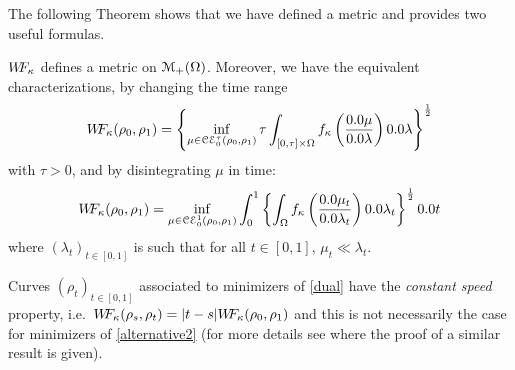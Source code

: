 The following Theorem shows that we have defined a metric and provides two useful formulas. 

\begin{theorem}
$W\! \! F_{\kappa}$ defines a metric on $\mathcal{M}_+(\Omega)$. Moreover, we have the equivalent characterizations, by changing the time range
\begin{equation}
\label{alternative1}
\WF_{\kappa}(\rho_0,\rho_1) = \left\{ \inf_{\mu \in \mathcal{CE}_0^{\tau}(\rho_0,\rho_1)} \tau  \int_{[0,\tau] \times \Om} \fonc\left(\frac{\d\mu}{\d\lambda}\right) \d\lambda \right\}^{\frac12} 
\end{equation}
with $\tau > 0$, and by disintegrating $\mu$ in time:
\begin{equation}
\label{alternative2}
\WF_{\kappa}(\rho_0,\rho_1)= \inf_{\mu \in \mathcal{CE}_0^1(\rho_0,\rho_1)} \int_0^1 \left\{ \int_{\Om} \fonc\left( \frac{\d\mu_t}{\d\lambda_t}\right) \d\lambda_t \right\}^{\frac12} \d t
\end{equation}
where $(\lambda_t)_{t\in [0,1]}$ is such that for all $t \in [0,1]$, $\mu_t \ll \lambda_t$.
\end{theorem}

\begin{remark}
Curves $(\rho_t)_{t\in [0,1]}$ associated to minimizers of \eqref{dual} have the \emph{constant speed} property, i.e.\ $W\! \! F_\kappa (\rho_s,\rho_t) = |t-s| W\! \! F_\kappa(\rho_0,\rho_1)$ and this is not necessarily the case for minimizers of \eqref{alternative2} (for more details see \cite[Theorem 5.4]{dolbeault2009new} where the proof of a similar result is given).
\end{remark}

